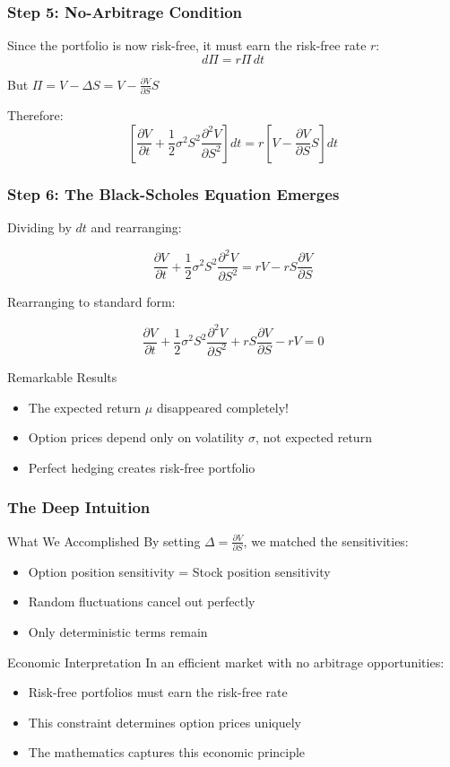 \documentclass{beamer}
\begin{document}
\begin{frame}
\frametitle{Step 5: No-Arbitrage Condition}
Since the portfolio is now risk-free, it must earn the risk-free rate $r$:
$$d\Pi = r\Pi \, dt$$

But $\Pi = V - \Delta S = V - \frac{\partial V}{\partial S}S$

Therefore:
$$\left[\frac{\partial V}{\partial t} + \frac{1}{2}\sigma^2 S^2 \frac{\partial^2 V}{\partial S^2}\right] dt = r\left[V - \frac{\partial V}{\partial S}S\right] dt$$
\end{frame}

\begin{frame}
\frametitle{Step 6: The Black-Scholes Equation Emerges}
Dividing by $dt$ and rearranging:

$$\frac{\partial V}{\partial t} + \frac{1}{2}\sigma^2 S^2 \frac{\partial^2 V}{\partial S^2} = rV - rS\frac{\partial V}{\partial S}$$

Rearranging to standard form:

$$\frac{\partial V}{\partial t} + \frac{1}{2}\sigma^2 S^2 \frac{\partial^2 V}{\partial S^2} + rS\frac{\partial V}{\partial S} - rV = 0$$

\begin{block}{Remarkable Results}
\begin{itemize}
\item The expected return $\mu$ disappeared completely!
\item Option prices depend only on volatility $\sigma$, not expected return
\item Perfect hedging creates risk-free portfolio
\end{itemize}
\end{block}
\end{frame}

\begin{frame}
\frametitle{The Deep Intuition}
\begin{block}{What We Accomplished}
By setting $\Delta = \frac{\partial V}{\partial S}$, we matched the sensitivities:
\begin{itemize}
\item Option position sensitivity = Stock position sensitivity
\item Random fluctuations cancel out perfectly
\item Only deterministic terms remain
\end{itemize}
\end{block}

\begin{block}{Economic Interpretation}
In an efficient market with no arbitrage opportunities:
\begin{itemize}
\item Risk-free portfolios must earn the risk-free rate
\item This constraint determines option prices uniquely
\item The mathematics captures this economic principle
\end{itemize}
\end{block}
\end{frame}
\end{document}
